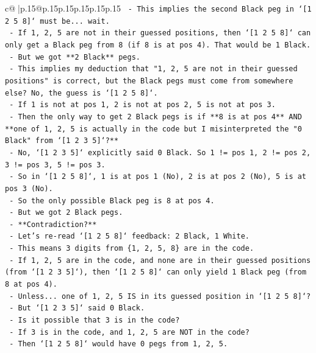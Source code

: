 \documentclass{article}
\begin{document}
{\begin{supertabular}{c@{$\;$}|p{.15\linewidth}@{}p{.15\linewidth}p{.15\linewidth}p{.15\linewidth}p{.15\linewidth}p{.15\linewidth}}
{{{\texttt{        {-} This implies the second Black peg in `{[}1 2 5 8{]}` must be... wait.} \\
\texttt{        {-} If 1, 2, 5 are not in their guessed positions, then `{[}1 2 5 8{]}` can only get a Black peg from 8 (if 8 is at pos 4). That would be 1 Black.} \\
\texttt{        {-} But we got **2 Black** pegs.} \\
\texttt{        {-} This implies my deduction that "1, 2, 5 are not in their guessed positions" is correct, but the Black pegs must come from somewhere else? No, the guess is `{[}1 2 5 8{]}`.} \\
\texttt{        {-} If 1 is not at pos 1, 2 is not at pos 2, 5 is not at pos 3.} \\
\texttt{        {-} Then the only way to get 2 Black pegs is if **8 is at pos 4** AND **one of 1, 2, 5 is actually in the code but I misinterpreted the "0 Black" from `{[}1 2 3 5{]}`?**} \\
\texttt{        {-} No, `{[}1 2 3 5{]}` explicitly said 0 Black. So 1 != pos 1, 2 != pos 2, 3 != pos 3, 5 != pos 3.} \\
\texttt{        {-} So in `{[}1 2 5 8{]}`, 1 is at pos 1 (No), 2 is at pos 2 (No), 5 is at pos 3 (No).} \\
\texttt{        {-} So the only possible Black peg is 8 at pos 4.} \\
\texttt{        {-} But we got 2 Black pegs.} \\
\texttt{        {-} **Contradiction?**} \\
\texttt{        {-} Let's re{-}read `{[}1 2 5 8{]}` feedback: 2 Black, 1 White.} \\
\texttt{        {-} This means 3 digits from \{1, 2, 5, 8\} are in the code.} \\
\texttt{        {-} If 1, 2, 5 are in the code, and none are in their guessed positions (from `{[}1 2 3 5{]}`), then `{[}1 2 5 8{]}` can only yield 1 Black peg (from 8 at pos 4).} \\
\texttt{        {-} Unless... one of 1, 2, 5 IS in its guessed position in `{[}1 2 5 8{]}`?} \\
\texttt{        {-} But `{[}1 2 3 5{]}` said 0 Black.} \\
\texttt{        {-} Is it possible that 3 is in the code?} \\
\texttt{        {-} If 3 is in the code, and 1, 2, 5 are NOT in the code?} \\
\texttt{        {-} Then `{[}1 2 5 8{]}` would have 0 pegs from 1, 2, 5.} \\
}}}
\end{supertabular}}
\end{document}
